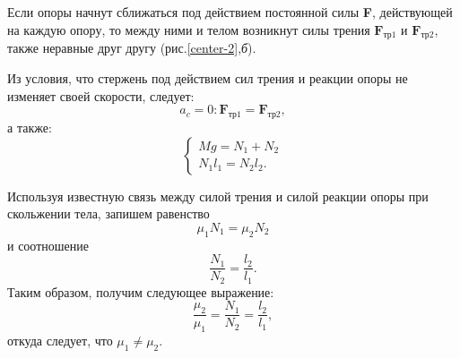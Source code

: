 \documentclass[14pt,a4paper,oneside]{extarticle}	%
\begin{document}
		Если опоры начнут сближаться под действием постоянной силы \textbf{F}, действующей на каждую опору, то между ними и телом возникнут силы трения $ \textbf{F}_{\text{тр}1} $ и $ \textbf{F}_{\text{тр}2} $, также неравные друг другу (рис.\ref{center-2},\textit{б}).
				
		Из условия, что стержень под действием сил трения и реакции опоры не изменяет своей скорости, следует:
		\begin{equation}
		a_c=0: \textbf{F}_{\text{тр}1} =\textbf{F}_{\text{тр}2},
		\end{equation}	
		а также:
		\begin{equation}
		\begin{cases}
		Mg = N_1 + N_2 \\
		N_1l_1 = N_2l_2.
		\end{cases}
		\end{equation}

Используя известную связь между силой трения и силой реакции опоры при скольжении тела, запишем равенство
\begin{equation}
\mu_1N_1 =\mu_2N_2
\end{equation}
и соотношение
\begin{equation}
\dfrac{N_1}{N_2} =\dfrac{l_2}{l_1}.
\end{equation}
Таким образом, получим следующее выражение:
\begin{equation}
\dfrac{\mu_2}{\mu_1}=\dfrac{N_1}{N_2} =\dfrac{l_2}{l_1},
\end{equation}
откуда следует, что $ \mu_1 \neq \mu_2 $.
\end{document}
